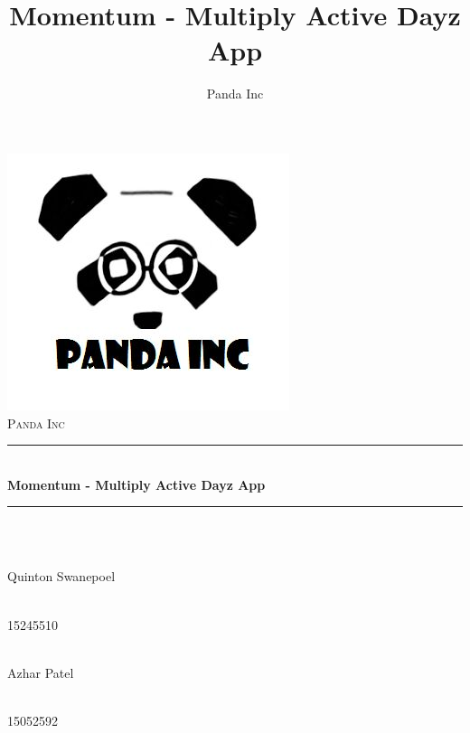 \documentclass[11pt]{article}
\author{Panda Inc}
\title{Momentum - Multiply Active Dayz App}
\begin{document}
\begin{titlepage}
	
	\begin{center}
        \includegraphics[width=0.7\linewidth]{Images/PandaInc_logo.jpg}\\[1cm] 
		\textsc{\LARGE Panda Inc}\\[0.3cm]
		\rule{\linewidth}{0.5mm} \\[1cm]
		{ \huge \bfseries Momentum - Multiply Active Dayz App}\\[0.5cm]
		\rule{\linewidth}{0.5mm} \\[1cm] 		
  
		
		\begin{minipage}{0.4\textwidth}
			\begin{flushleft} \large
				\emph{} \\
				Quinton {Swanepoel}
			\end{flushleft}
		\end{minipage}
		\begin{minipage}{0.4\textwidth}
			\begin{flushright} \large
				\emph{} \\
				15245510
			\end{flushright}
		\end{minipage}

		\begin{minipage}{0.4\textwidth}
			\begin{flushleft} \large
            	\emph{} \\
				Azhar {Patel}
			\end{flushleft}
		\end{minipage}
		\begin{minipage}{0.4\textwidth}
			\begin{flushright} \large
				\emph{} \\
				15052592
			\end{flushright}
		\end{minipage}
		

\end{center}
\end{titlepage}
\end{document}
